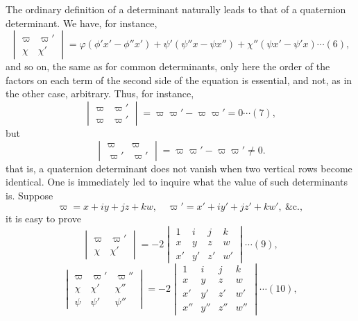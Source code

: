 \documentclass[11pt,a4paper]{book}
\begin{document}
The ordinary definition of a determinant naturally leads to that of a quaternion
determinant. We have, for instance,
\begin{equation}
\begin{vmatrix}
\varpi & \varpi' \\
\chi & \chi'
\end{vmatrix}
= \varphi(\phi'x' - \phi''x') + \psi'(\psi''x - \psi x'') + \chi''(\psi x' - \psi'x) \cdots (6),
\end{equation}
and so on, the same as for common determinants, only here the order of the factors on each
term of the second side of the equation is essential, and not, as in the other case,
arbitrary. Thus, for instance,
\begin{equation}
\begin{vmatrix}
\varpi & \varpi' \\
\varpi & \varpi'
\end{vmatrix}
= \varpi\varpi' - \varpi\varpi' = 0 \cdots (7),
\end{equation}
but
\[
\begin{vmatrix}
\varpi & \varpi \\
\varpi' & \varpi'
\end{vmatrix}
= \varpi\varpi' - \varpi\varpi' \neq 0.
\]
that is, a quaternion determinant does not vanish when two vertical rows become
identical. One is immediately led to inquire what the value of such determinants is.
Suppose
\[
\varpi = x + iy + jz + kw,\quad \varpi' = x' + iy' + jz' + kw',\ \&\text{c.},
\]
it is easy to prove
\begin{equation}
\begin{vmatrix}
\varpi & \varpi' \\
\chi & \chi'
\end{vmatrix}
= -2 \begin{vmatrix}
1 & i & j & k \\
x & y & z & w \\
x' & y' & z' & w'
\end{vmatrix} \cdots (9),
\end{equation}
\begin{equation}
\begin{vmatrix}
\varpi & \varpi' & \varpi'' \\
\chi & \chi' & \chi'' \\
\psi & \psi' & \psi''
\end{vmatrix}
= -2 \begin{vmatrix}
1 & i & j & k \\
x & y & z & w \\
x' & y' & z' & w' \\
x'' & y'' & z'' & w''
\end{vmatrix} \cdots (10),
\end{equation}
\end{document}
